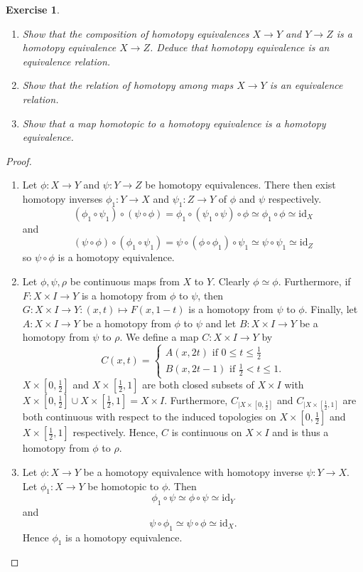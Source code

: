 \documentclass{article}
\newtheorem{exercise}[theorem]{Exercise}
\begin{document}
\begin{exercise}
\begin{enumerate}
\item[(a)] Show that the composition of homotopy equivalences $X\to Y$ and $Y\to Z$ is a homotopy equivalence $X\to Z$. Deduce that homotopy equivalence is an equivalence relation.
\item[(b)] Show that the relation of homotopy among maps $X\to Y$ is an equivalence relation.
\item[(c)] Show that a map homotopic to a homotopy equivalence is a homotopy equivalence.
\end{enumerate}
\end{exercise}
\begin{proof}
\begin{enumerate}
\item[(a)] Let $\phi:X\to Y$ and $\psi: Y\to Z$ be homotopy equivalences. There then exist homotopy inverses $\phi_1:Y\to X$ and $\psi_1: Z\to Y$ of $\phi$ and $\psi$ respectively.\[(\phi_1\circ\psi_1)\circ(\psi\circ\phi)= \phi_1\circ(\psi_1\circ\psi)\circ\phi\simeq\phi_1\circ\phi\simeq\text{id}_X\] and\[(\psi\circ\phi)\circ(\phi_1\circ\psi_1)=\psi\circ(\phi\circ\phi_1)\circ\psi_1\simeq\psi\circ\psi_1\simeq\text{id}_Z\]so $\psi\circ\phi$ is a homotopy equivalence.
\item[(b)] Let $\phi,\psi,\rho$ be continuous maps from $X$ to $Y$. Clearly $\phi\simeq\phi$. Furthermore, if $F:X\times I\to Y$ is a homotopy from $\phi$ to $\psi$, then $G:X\times I\to Y:(x,t)\mapsto F(x,1-t)$ is a homotopy from $\psi$ to $\phi$. Finally, let $A:X\times I\to Y$ be a homotopy from $\phi$ to $\psi$ and let $B:X\times I\to Y$ be a homotopy from $\psi$ to $\rho$. We define a map $C:X\times I\to Y$ by \[C(x,t)=\begin{cases}
    A(x,2t)\text{ if }0\leq t\leq \frac{1}{2}\\B(x,2t-1)\text{ if }\frac{1}{2}<t\leq 1.
\end{cases}\]$X\times[0,\frac{1}{2}]$ and $X\times[\frac{1}{2},1]$ are both closed subsets of $X\times I$ with $X\times[0,\frac{1}{2}]\cup X\times[\frac{1}{2},1]=X\times I$. Furthermore, $C_{|{X\times[0,\frac{1}{2}]}}$ and $C_{|{X\times[\frac{1}{2},1]}}$ are both continuous with respect to the induced topologies on $X\times[0,\frac{1}{2}]$ and $X\times[\frac{1}{2},1]$ respectively. Hence, $C$ is continuous on $X\times I$ and is thus a homotopy from $\phi$ to $\rho$.
\item[(c)] Let $\phi:X\to Y$ be a homotopy equivalence with homotopy inverse $\psi:Y\to X$. Let $\phi_1:X\to Y$ be homotopic to $\phi$. Then \[\phi_1\circ\psi\simeq\phi\circ\psi\simeq\text{id}_Y\] and \[\psi\circ\phi_1\simeq\psi\circ\phi\simeq\text{id}_X.\] Hence $\phi_1$ is a homotopy equivalence.
\end{enumerate}
\end{proof}
\end{document}
